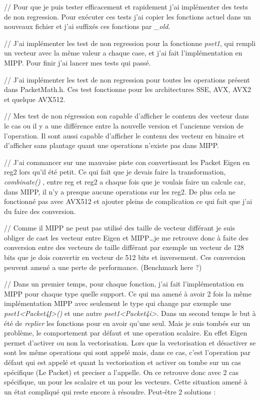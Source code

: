 // Pour que je puis tester efficacement et rapidement j'ai implémenter des tests de non
regression. Pour exécuter ces tests j'ai copier les fonctions actuel dans un nouveaux
fichier et j'ai suffixés ces fonctions par \emph{_old}.

// J'ai implémenter les test de non regression pour la fonctionne \emph{pset1}, qui
rempli un vecteur avec la même valeur a chaque case, et j'ai fait l'implémentation en
MIPP. Pour finir j'ai lancer mes tests qui passé.

// J'ai implémenter les test de non regression pour toutes les operations présent dans
PacketMath.h. Ces test fonctionne pour les architectures SSE, AVX, AVX2 et quelque AVX512.

// Mes test de non régression son capable d'afficher le contenu des vecteur dans le cas
ou il y a une différence entre la nouvelle version et l'ancienne version de l'operation.
Il sont aussi capable d'afficher le contenu des vecteur en binaire et d'afficher sans
plantage quant une operations n'existe pas dans MIPP.


// J'ai commancer sur une mauvaise piste con convertissant les Packet Eigen en reg2
lors qu'il été petit. Ce qui fait que je devais faire la transformation, \emph{combinate()}
, entre reg et reg2 a chaque fois que je voulais faire un calcule car, dans MIPP, il
n'y a presque aucune operations sur les reg2. De plus cela ne fonctionné pas avec AVX512
et ajouter pleins de complication ce qui fait que j'ai du faire des conversion.

// Comme il MIPP ne peut pas utilisé des taille de vecteur différant je suis obliger de
cast les vecteur entre Eigen et MIPP\dots je me retrouve donc à faite des conversion
entre des vecteurs de taille différant par exemple un vecteur de 128 bits que je dois
convertir en vecteur de 512 bits et inversement. Ces conversion peuvent amené a une
perte de performance. (Benchmark here ?)

// Dans un premier temps, pour chaque fonction, j'ai fait l'implémentation en MIPP pour
chaque type quelle support. Ce qui ma amené à avoir 2 fois la même implémentation MIPP
avec seulement le type qui change par exemple une \emph{pset1<Packet4f>()} et une autre
\emph{pset1<Packet4i>}. Dans un second temps le but à été de \textit{replier} les
fonctions pour en avoir qu'une seul. Mais je suis tombés sur un problème, le
comportement par défaut et une operation scalaire. En effet Eigen permet d'activer
ou non la vectorisation. Lors que la vectorisation et désactiver se sont les même
operations qui sont appelé mais, dans ce cas, c'est l'operation par défaut qui est
appelé et quant la vectorisation et activer on tombe sur un cas spécifique (Le Packet)
et preciser a l'appelle. On ce retrouve donc avec 2 cas spécifique, un pour les scalaire
et un pour les vecteurs. Cette situation amené à un état compliqué qui reste encore à
résoudre. Peut-être 2 solutions :

